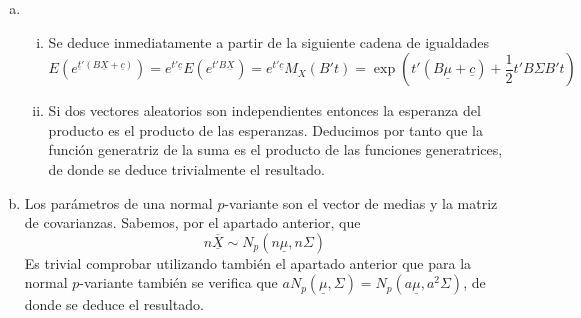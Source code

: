 \documentclass[twoside]{article}
\newcommand{\media}[1]{{\overline{#1}}}
\newcommand{\muestra}[1]{{\underline{#1}}}
\newcommand{\m}[1]{{\muestra{#1}}}
\newcommand{\mX}{{\muestra{X}}}
\begin{document}
\begin{solucion}
\begin{enumerate}[(a)]
\item 
\begin{enumerate}[i.]
\item Se deduce inmediatamente a partir de la siguiente cadena de igualdades
\[ E\left(e^{\m{t}'(B\mX+\muestra{c})}\right) = e^{t'\muestra{c}}E\left(e^{t'B\mX}\right) = e^{t'\muestra{c}}M_X(B't) = \exp\left(t'(B\muestra{\mu}+\muestra{c})+\frac{1}{2}t'B\Sigma B't\right)\]
\item Si dos vectores aleatorios son independientes entonces la esperanza del producto es el producto de las esperanzas. Deducimos por tanto que la función generatriz de la suma es el producto de las funciones generatrices, de donde se deduce trivialmente el resultado.
\end{enumerate}
\item Los parámetros de una normal $p$-variante son el vector de medias y la matriz de covarianzas. Sabemos, por el apartado anterior, que 
$$
n\media{\mX}\sim N_p(n\muestra{\mu},n\Sigma)
$$
Es trivial comprobar utilizando también el apartado anterior que para la normal $p$-variante también se verifica que $a N_p(\muestra{\mu},\Sigma)= N_p(a\muestra{\mu},a^2\Sigma)$, de donde se deduce el resultado.
\end{enumerate}
\end{solucion}
\newpage
\end{document}
